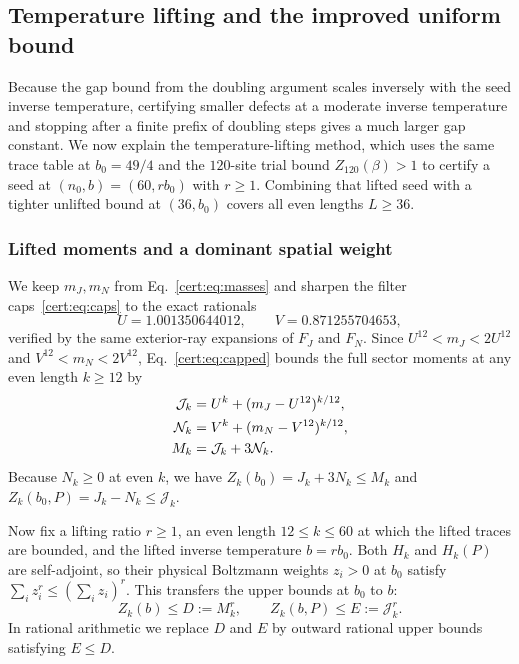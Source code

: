 \subsection{Temperature lifting and the improved uniform bound}
\label{cert:sec:lifting}

Because the gap bound from the doubling argument scales inversely with the
seed inverse temperature, certifying smaller defects at a moderate inverse
temperature and stopping after a finite prefix of doubling steps gives a
much larger gap constant. We now explain the temperature-lifting method,
which uses the same trace table at $b_0=49/4$ and the $120$-site trial
bound $Z_{120}(\beta)>1$ to certify a seed at $(n_0,b)=(60,rb_0)$ with
$r\ge1$. Combining that lifted seed with a tighter unlifted bound at
$(36,b_0)$ covers all even lengths $L\ge36$.

\subsubsection{Lifted moments and a dominant spatial weight}
\label{cert:sec:lifted-moments}

We keep $m_J,m_N$ from Eq.~\eqref{cert:eq:masses} and sharpen the filter
caps~\eqref{cert:eq:caps} to the exact rationals
\begin{equation}
 U=1.001350644012,\qquad V=0.871255704653,
 \label{cert:eq:tight-caps}
\end{equation}
verified by the same exterior-ray expansions of $F_J$ and $F_N$.
Since $U^{12}<m_J<2U^{12}$ and $V^{12}<m_N<2V^{12}$, Eq.~\eqref{cert:eq:capped}
bounds the full sector moments at any even length $k\ge12$ by
\begin{align}
 \mathcal J_k&=U^k+(m_J-U^{12})^{k/12},\notag \\
 \mathcal N_k&=V^k+(m_N-V^{12})^{k/12},\notag \\
 M_k&=\mathcal J_k+3\mathcal N_k.
 \label{cert:eq:moment-upper}
\end{align}
Because $N_k\ge0$ at even $k$, we have $Z_k(b_0)=J_k+3N_k\le M_k$ and
$Z_k(b_0,P)=J_k-N_k\le\mathcal J_k$.

Now fix a lifting ratio $r\ge1$, an even length $12\le k\le60$ at which
the lifted traces are bounded, and the lifted inverse temperature
$b=rb_0$. Both $H_k$ and $H_k(P)$ are
self-adjoint, so their physical Boltzmann weights $z_i>0$ at $b_0$ satisfy
$\sum_i z_i^r\le(\sum_i z_i)^r$. This transfers the upper bounds at $b_0$
to $b$:
\begin{equation}
 Z_k(b)\le D:=M_k^r,\qquad
 Z_k(b,P)\le E:=\mathcal J_k^r.
 \label{cert:eq:temperature-lift}
\end{equation}
In rational arithmetic we replace $D$ and $E$ by outward rational upper
bounds satisfying $E\le D$.

